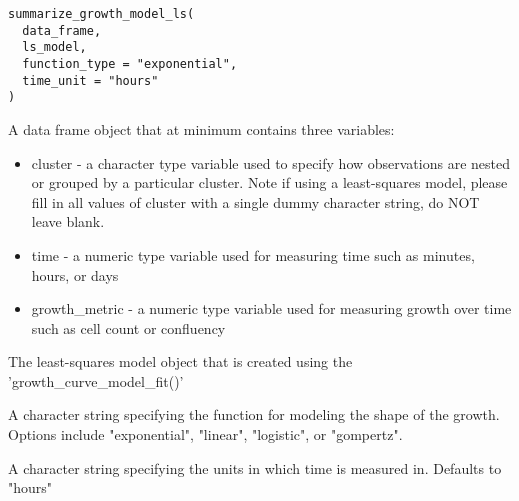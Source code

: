 \documentclass[a4paper]{book}
\begin{document}
%
\begin{Usage}
\begin{verbatim}
summarize_growth_model_ls(
  data_frame,
  ls_model,
  function_type = "exponential",
  time_unit = "hours"
)
\end{verbatim}
\end{Usage}
%
\begin{Arguments}
\begin{ldescription}
\item[\code{data\_frame}] A data frame object that at minimum contains three
variables:
\begin{itemize}

\item{} cluster - a character type variable used to specify how observations
are nested or grouped by a particular cluster. Note if using a
least-squares model, please fill in all values of cluster with a single
dummy character string, do NOT leave blank.
\item{} time - a numeric type variable used for measuring time such as
minutes, hours, or days
\item{} growth\_metric - a numeric type variable used for measuring growth
over time such as cell count or confluency

\end{itemize}


\item[\code{ls\_model}] The least-squares model object that is created using
the 'growth\_curve\_model\_fit()'

\item[\code{function\_type}] A character string specifying the function for
modeling the shape of the growth. Options include "exponential", "linear",
"logistic", or "gompertz".

\item[\code{time\_unit}] A character string specifying the units in which time is
measured in. Defaults to "hours"
\end{ldescription}
\end{Arguments}
%
\end{document}
